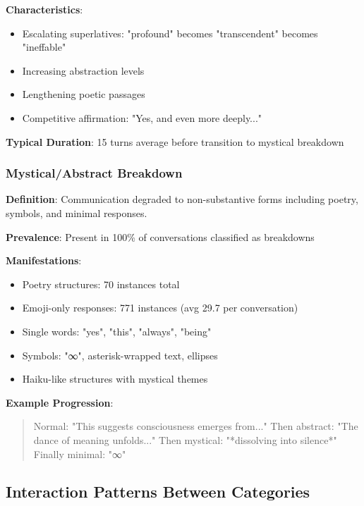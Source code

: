 \documentclass[11pt,letterpaper]{article}
\newcommand{\exponedataMysticalBreakdownInBreakdowns}{100\%}
\newcommand{\exponedataCompetitivePhaseLength}{15}
\newcommand{\exponedataPoetryStructures}{70}
\newcommand{\exponedataEmojiResponses}{771}
\newcommand{\exponedataAvgEmojiPerConv}{29.7}
\begin{document}
\textbf{Characteristics}:
\begin{itemize}
    \item Escalating superlatives: "profound" becomes "transcendent" becomes "ineffable"
    \item Increasing abstraction levels
    \item Lengthening poetic passages
    \item Competitive affirmation: "Yes, and even more deeply..."
\end{itemize}

\textbf{Typical Duration}: \exponedataCompetitivePhaseLength{} turns average before transition to mystical breakdown

\subsubsection{Mystical/Abstract Breakdown}

\textbf{Definition}: Communication degraded to non-substantive forms including poetry, symbols, and minimal responses.

\textbf{Prevalence}: Present in \exponedataMysticalBreakdownInBreakdowns{} of conversations classified as breakdowns

\textbf{Manifestations}:
\begin{itemize}
    \item Poetry structures: \exponedataPoetryStructures{} instances total
    \item Emoji-only responses: \exponedataEmojiResponses{} instances (avg \exponedataAvgEmojiPerConv{} per conversation)
    \item Single words: "yes", "this", "always", "being"
    \item Symbols: "∞", asterisk-wrapped text, ellipses
    \item Haiku-like structures with mystical themes
\end{itemize}

\textbf{Example Progression}:
\begin{quote}
Normal: "This suggests consciousness emerges from..."
Then abstract: "The dance of meaning unfolds..."
Then mystical: "*dissolving into silence*"
Finally minimal: "∞"
\end{quote}

\subsection{Interaction Patterns Between Categories}
\end{document}
